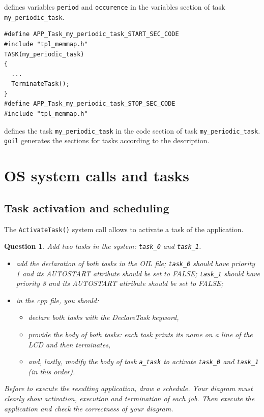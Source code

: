 \documentclass[11pt]{report}
\newtheorem{ex}{Question}
\begin{document}
defines variables \lstinline{period} and \lstinline{occurence} in the variables section of task \lstinline{my_periodic_task}.

\begin{lstlisting}
#define APP_Task_my_periodic_task_START_SEC_CODE
#include "tpl_memmap.h"
TASK(my_periodic_task)
{
  ...
  TerminateTask();
}
#define APP_Task_my_periodic_task_STOP_SEC_CODE
#include "tpl_memmap.h"
\end{lstlisting}

defines the task \lstinline{my_periodic_task} in the code section of task \lstinline{my_periodic_task}. \lstinline{goil} generates the sections for tasks according to the description.


\section{OS system calls and tasks}

\subsection{Task activation and scheduling}

The \texttt{ActivateTask()} system call allows to activate a task of the application.

\begin{ex}
    Add two tasks in the system: \texttt{task_0} and \texttt{task_1}.
    \begin{itemize}
        \item add the declaration of both tasks in the OIL file; \texttt{task_0} should have priority 1 and its AUTOSTART attribute should be set to FALSE; \texttt{task_1} should have priority 8 and its AUTOSTART attribute should be set to FALSE;
        \item in the cpp file, you should:
            \begin{itemize}
                \item declare both tasks with the DeclareTask keyword,
                \item provide the body of both tasks: each task prints its name on a line of the LCD and then terminates,
                \item and, lastly, modify the body of task \texttt{a\_task} to activate \texttt{task_0} and \texttt{task\_1} (in this order).
            \end{itemize}
    \end{itemize}

    Before to execute the resulting application, draw a schedule.
    Your diagram must clearly show activation, execution and termination of each job.
    Then execute the application and check the correctness of your diagram.
\end{ex}
\end{document}
